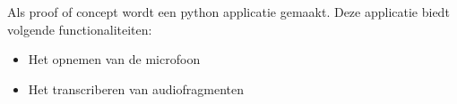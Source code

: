 %
%
%
%


\section{} \label{sect:Proof-of-concept}%

Als proof of concept wordt een python applicatie gemaakt. Deze applicatie biedt volgende functionaliteiten:
\begin{itemize}
    \item Het opnemen van de microfoon
    \item Het transcriberen van audiofragmenten
\end{itemize}

